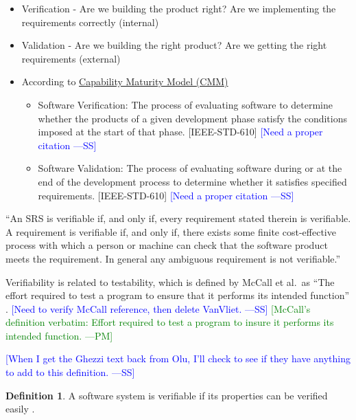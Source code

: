 \documentclass[letterpaper, cleveref]{lipics-v2019}
\newcommand{\authornote}[3]{\textcolor{#1}{[#3 ---#2]}}
\newcommand{\authornote}[3]{}
\newcommand{\wss}[1]{\authornote{blue}{SS}{#1}} %
\newcommand{\pmi}[1]{\authornote{green}{PM}{#1}} %
\theoremstyle{definition}
\newtheorem{defn}{Definition}
\begin{document}
\begin{itemize}
	
\item Verification - Are we building the product right?  Are we implementing
the requirements correctly (internal) \item Validation - Are we building the
right product? Are we getting the right requirements (external) \item
According to  \href{https://en.wikipedia.org/wiki/Software_verification_and_validation}
{Capability Maturity Model (CMM)}

\begin{itemize}
\item Software Verification: The process of evaluating software to determine
      whether the products of a given development phase satisfy the conditions
      imposed at the start of that phase. [IEEE-STD-610] \wss{Need a proper
      citation}
\item Software Validation: The process of evaluating software during or at the
      end of the development process to determine whether it satisfies specified
      requirements. [IEEE-STD-610] \wss{Need a proper citation}
\end{itemize}

\end{itemize}
  
``An SRS is verifiable if, and only if, every requirement stated therein is
verifiable. A requirement is verifiable if, and only if, there exists some
finite cost-effective process with which a person or machine can check that the
software product meets the requirement. In general any ambiguous requirement is
not verifiable.'' \citep{IEEE1998}
  
Verifiability is related to testability, which is defined by McCall et al.\
as ``The effort required to test a program to ensure that it performs its
intended function'' \citep{VanVliet2000}. \wss{Need to verify McCall
reference, then delete VanVliet.} \pmi{McCall's definition verbatim: Effort
required to test a program to insure it performs its intended function.}
  
\wss{When I get the Ghezzi text back from Olu, I'll check to see if they have 
anything to add to this definition.}
  
\begin{defn}
  A software system is verifiable if its properties can be verified easily
  \citep{ghezzi1991fundamentals}.
\end{defn}
\end{document}

